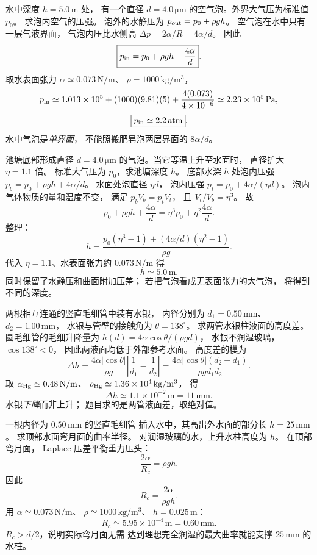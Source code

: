 水中深度 $h=5.0\,\mathrm m$ 处，
有一个直径 $d=4.0\,\mathrm{\mu m}$
的空气泡。外界大气压为标准值 $p_0$。
求泡内空气的压强。
\exsolution
泡外的水静压为
$p_{\rm out}=p_0+\rho gh$。
空气泡在水中只有一层气液界面，
气泡内压比水侧高
$\Delta p=2\alpha/R=4\alpha/d$。
因此
\[
\boxed{p_{\rm in}=p_0+\rho gh+\frac{4\alpha}{d}}.
\]
取水表面张力
$\alpha\simeq0.073\,\mathrm{N/m}$、
$\rho=1000\,\mathrm{kg/m^3}$，
\[
p_{\rm in}\simeq1.013\times10^5+
(1000)(9.81)(5)+\frac{4(0.073)}{4\times10^{-6}}
\simeq2.23\times10^5\,\mathrm{Pa},
\]
\[
\boxed{p_{\rm in}\simeq2.2\,\mathrm{atm}}.
\]
\excheck 水中气泡是\emph{单界面}，
不能照搬肥皂泡两层界面的 $8\alpha/d$。

池塘底部形成直径 $d=4.0\,\mathrm{\mu m}$
的气泡。当它等温上升至水面时，
直径扩大 $\eta=1.1$ 倍。
标准大气压为 $p_0$，求池塘深度 $h$。
\exsolution
底部水深 $h$ 处泡内压强
$p_b=p_0+\rho gh+4\alpha/d$。
水面处泡直径 $\eta d$，
泡内压强
$p_t=p_0+4\alpha/(\eta d)$。
泡内气体物质的量和温度不变，
满足
$p_bV_b=p_tV_t$，
且 $V_t/V_b=\eta^3$。
故
\[
p_0+\rho gh+\frac{4\alpha}{d}
=\eta^3p_0+\eta^2\frac{4\alpha}{d}.
\]
整理：
\[
\boxed{h=\frac{
p_0(\eta^3-1)+(4\alpha/d)(\eta^2-1)
}{\rho g}}.
\]
代入 $\eta=1.1$、水表面张力约
$0.073\,\mathrm{N/m}$ 得
\[
\boxed{h\simeq5.0\,\mathrm m}.
\]
\excheck 同时保留了水静压和曲面附加压差；
若把气泡看成无表面张力的大气泡，
将得到不同的深度。

两根相互连通的竖直毛细管中装有水银，
内径分别为
$d_1=0.50\,\mathrm{mm}$、
$d_2=1.00\,\mathrm{mm}$，
水银与管壁的接触角为
$\theta=138^\circ$。
求两管水银柱液面的高度差。
\exsolution
圆毛细管的毛细升降量为
$h(d)=4\alpha\cos\theta/(\rho gd)$，
水银不润湿玻璃，$\cos138^\circ<0$，
因此两液面均低于外部参考水面。
高度差的模为
\[
\boxed{\Delta h=
\frac{4\alpha|\cos\theta|}{\rho g}
\left|\frac1{d_1}-\frac1{d_2}\right|
=\frac{4\alpha|\cos\theta|(d_2-d_1)}
{\rho gd_1d_2}}.
\]
取 $\alpha_{\rm Hg}\simeq0.48\,\mathrm{N/m}$、
$\rho_{\rm Hg}\simeq1.36\times10^4\,\mathrm{kg/m^3}$，
得
\[
\boxed{\Delta h\simeq1.1\times10^{-2}\,\mathrm m
=11\,\mathrm{mm}}.
\]
\excheck 水银\emph{下降}而非上升；
题目求的是两管液面差，取绝对值。

一根内径为 $0.50\,\mathrm{mm}$ 的竖直毛细管
插入水中，其高出外水面的部分长
$h=25\,\mathrm{mm}$。
求顶部水面弯月面的曲率半径。
\exsolution
对润湿玻璃的水，上升水柱高度为 $h$。
在顶部弯月面，
Laplace 压差平衡重力压头：
\[
\frac{2\alpha}{R_c}=\rho gh.
\]
因此
\[
\boxed{R_c=\frac{2\alpha}{\rho gh}}.
\]
用 $\alpha\simeq0.073\,\mathrm{N/m}$、
$\rho\simeq1000\,\mathrm{kg/m^3}$、
$h=0.025\,\mathrm m$：
\[
\boxed{R_c\simeq5.95\times10^{-4}\,\mathrm m
=0.60\,\mathrm{mm}}.
\]
\excheck $R_c>d/2$，说明实际弯月面无需
达到理想完全润湿的最大曲率就能支撑
$25\,\mathrm{mm}$ 的水柱。

